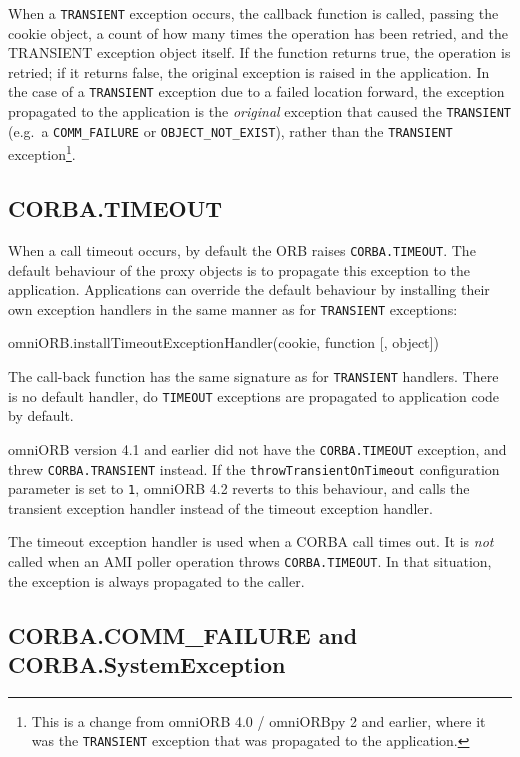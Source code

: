 \documentclass[11pt,oneside,a4paper]{book}
\newcommand{\code}[1]{\texttt{#1}}
\begin{document}
When a \code{TRANSIENT} exception occurs, the callback function is
called, passing the cookie object, a count of how many times the
operation has been retried, and the TRANSIENT exception object
itself. If the function returns true, the operation is retried; if it
returns false, the original exception is raised in the application. In
the case of a \code{TRANSIENT} exception due to a failed location
forward, the exception propagated to the application is the
\emph{original} exception that caused the \code{TRANSIENT} (e.g.\ a
\code{COMM\_FAILURE} or \code{OBJECT\_NOT\_EXIST}), rather than the
\code{TRANSIENT} exception\footnote{This is a change from omniORB 4.0
  / omniORBpy 2 and earlier, where it was the \code{TRANSIENT}
  exception that was propagated to the application.}.


\subsection{CORBA.TIMEOUT}

When a call timeout occurs, by default the ORB raises
\code{CORBA.TIMEOUT}. The default behaviour of the proxy objects is
to propagate this exception to the application. Applications can
override the default behaviour by installing their own exception
handlers in the same manner as for \code{TRANSIENT} exceptions:

\begin{pylisting}
omniORB.installTimeoutExceptionHandler(cookie, function [, object])
\end{pylisting}

The call-back function has the same signature as for \code{TRANSIENT}
handlers. There is no default handler, do \code{TIMEOUT} exceptions
are propagated to application code by default.

omniORB version 4.1 and earlier did not have the \code{CORBA.TIMEOUT}
exception, and threw \code{CORBA.TRANSIENT} instead. If the
\code{throwTransientOnTimeout} configuration parameter is set to
\code{1}, omniORB 4.2 reverts to this behaviour, and calls the
transient exception handler instead of the timeout exception handler.

The timeout exception handler is used when a CORBA call times out. It
is \emph{not} called when an AMI poller operation throws
\code{CORBA.TIMEOUT}. In that situation, the exception is always
propagated to the caller.


\subsection{CORBA.COMM\_FAILURE and CORBA.SystemException}
\end{document}
